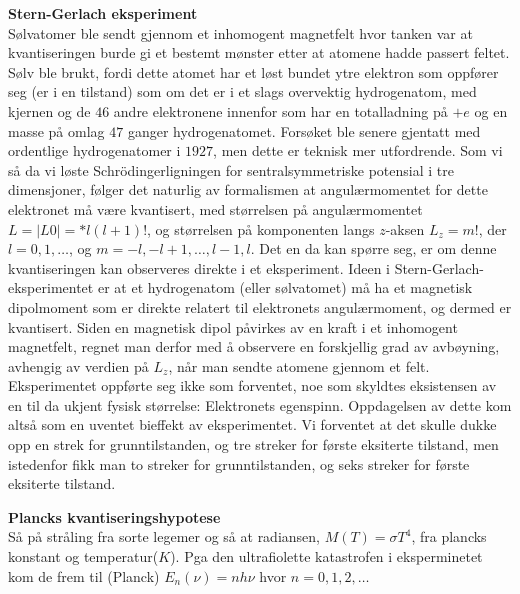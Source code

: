 \documentclass[8pt, A4paper, norsk]{extarticle}
\begin{document}
\begin{multicols*}{3}
\centering \textbf{Stern-Gerlach eksperiment} \\
Sølvatomer ble sendt gjennom et inhomogent magnetfelt hvor tanken var at kvantiseringen burde gi et bestemt mønster etter at atomene hadde passert feltet. Sølv ble brukt, fordi dette atomet har et løst bundet ytre elektron som oppfører seg (er i en tilstand) som om det er i et slags overvektig hydrogenatom, med kjernen og de $46$ andre elektronene innenfor som har en totalladning på $+e$ og en masse på omlag $47$ ganger hydrogenatomet. Forsøket ble senere gjentatt med ordentlige hydrogenatomer i $1927$, men dette er teknisk mer utfordrende. Som vi så da vi løste Schrödingerligningen for sentralsymmetriske potensial i tre dimensjoner, følger det naturlig av formalismen at angulærmomentet for dette elektronet må være kvantisert, med størrelsen på angulærmomentet $L = |L0 | = *l(l + 1)!$, og størrelsen på komponenten langs $z$-aksen $L_z = m!$, der $l = 0, 1, \dots$, og $m = -l, -l + 1, \dots, l - 1, l$. Det en da kan spørre seg, er om denne kvantiseringen kan observeres direkte i et eksperiment. Ideen i Stern-Gerlach-eksperimentet er at et hydrogenatom (eller sølvatomet) må ha et magnetisk dipolmoment som er direkte relatert til elektronets angulærmoment, og dermed er kvantisert. Siden en magnetisk dipol påvirkes av en kraft i et inhomogent magnetfelt, regnet man derfor med å observere en forskjellig grad av avbøyning, avhengig av verdien på $L_z$, når man sendte atomene gjennom et felt. Eksperimentet oppførte seg ikke som forventet, noe som skyldtes eksistensen av en til da ukjent fysisk størrelse: Elektronets egenspinn. Oppdagelsen av dette kom altså som en uventet bieffekt av eksperimentet. Vi forventet at det skulle dukke opp en strek for grunntilstanden, og tre streker for første eksiterte tilstand, men istedenfor fikk man to streker for grunntilstanden, og seks streker for første eksiterte tilstand.

\vspace{2mm}

\centering \textbf{Plancks kvantiseringshypotese} \\
Så på stråling fra sorte legemer og så at radiansen, $M(T) = \sigma T^4$, fra plancks konstant og temperatur($K$). Pga den ultrafiolette katastrofen i eksperminetet kom de frem til (Planck) $E_n(\nu) = nh \nu$ hvor $n = 0, 1, 2, \dots$

\vspace{2mm}


\end{multicols*}
\end{document}
